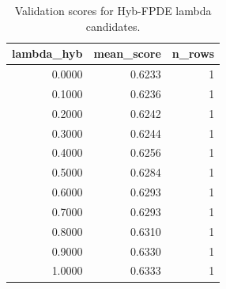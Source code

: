 \begin{table}[t]
\caption{Validation scores for Hyb-FPDE lambda candidates.}
\label{tab:lambda_distribution_computed}
\centering
\begin{tabular}{rrr}
\toprule
lambda\_hyb & mean\_score & n\_rows \\
\midrule
0.0000 & 0.6233 & 1 \\
0.1000 & 0.6236 & 1 \\
0.2000 & 0.6242 & 1 \\
0.3000 & 0.6244 & 1 \\
0.4000 & 0.6256 & 1 \\
0.5000 & 0.6284 & 1 \\
0.6000 & 0.6293 & 1 \\
0.7000 & 0.6293 & 1 \\
0.8000 & 0.6310 & 1 \\
0.9000 & 0.6330 & 1 \\
1.0000 & 0.6333 & 1 \\
\bottomrule
\end{tabular}

\end{table}
